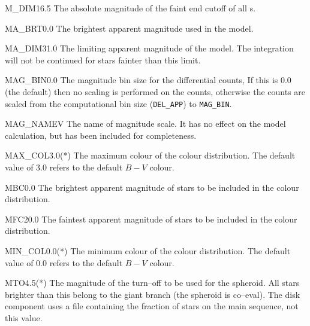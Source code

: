 \documentclass[11pt,twoside]{article}
\begin{document}
\begin{key}{M\_DIM}{16.5}{}
The absolute magnitude of the faint end cutoff of all \lf s.
\end{key}

\begin{key}{MA\_BRT}{0.0}{}
The brightest apparent magnitude used in the model.
\end{key}

\begin{key}{MA\_DIM}{31.0}{}
The limiting apparent magnitude of the model. The integration will not be 
continued for stars fainter than this limit.
\end{key}

\begin{key}{MAG\_BIN}{0.0}{}
The magnitude bin size for the differential counts, If this is 0.0 (the
default) then no scaling is performed on the counts, otherwise the counts
are scaled from the computational bin size ({\tt DEL\_APP}) to {\tt MAG\_BIN}.
\end{key}

\begin{key}{MAG\_NAME}{V}{}
The name of magnitude scale. It has no effect on the model calculation, but 
has been included for completeness.
\end{key}

\begin{key}{MAX\_COL}{3.0}{(*)}
The maximum colour of the colour distribution. The default value of 3.0 
refers to the default $B-V$ colour.
\end{key}

\begin{key}{MBC}{0.0}{}
The brightest apparent magnitude of stars to be included in the colour 
distribution.
\end{key}

\begin{key}{MFC}{20.0}{}
The faintest apparent magnitude of stars to be included in the colour 
distribution.
\end{key}

\begin{key}{MIN\_COL}{0.0}{(*)}
The minimum colour of the colour distribution. The default value of 0.0 
refers to the default $B-V$ colour.
\end{key}

\begin{key}{MTO}{4.5}{(*)}
The magnitude of the turn--off to be used for the spheroid. All stars brighter
than this belong to the giant branch (the spheroid is co--eval). The disk
component uses a file containing the fraction of stars on the main sequence, 
not this value.
\end{key}
\end{document}
